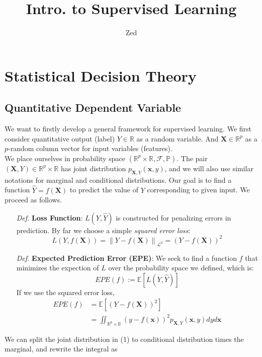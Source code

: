 \documentclass[a4paper, 11pt]{article}
\title{\textbf{Intro. to Supervised Learning}}
\author{Zed}
\begin{document}
\maketitle
\section{Statistical Decision Theory}

\subsection{Quantitative Dependent Variable}
We want to firstly develop a general framework for supervised learning. We first consider quantitative output (label) $Y\in \mathbb{R}$ as a random variable. And $\bm{X}\in \mathbb{R}^p$ as a $p$-random column vector for input variables (features). 
~\\
We place ourselves in probability space $(\mathbb{R}^p\times \mathbb{R}, \mathcal{F}, \mathbb{P})$. The pair $(\bm{X}, Y)\in \mathbb{R}^p\times \mathbb{R}$ has joint distribution $p_{\bm{X},Y}(\bm{x},y)$, and we will also use similar notations for marginal and conditional distributions. Our goal is to find a function $\hat{Y}=f(\bm{X})$ to predict the value of $Y$ corresponding to given input. We proceed as follows.
\begin{itemize}
	\item[\textit{Def.}] \textbf{Loss Function}: $L(Y, \hat{Y})$ is constructed for penalizing errors in prediction. By far we choose a simple \emph{squared error loss}:
	$$
	L(Y,f(\bm{X})) = \left\|Y-f(\bm{X})\right\|_{\mathcal{L}^2} = (Y-f(\bm{X}))^2
	$$

	\item[\textit{Def.}] \textbf{Expected Prediction Error (EPE)}: We seek to find a function $f$ that minimizes the expection of $L$ over the probability space we defined, which is:
	$$
	EPE(f):=\mathbb{E}\left[L(Y, \hat{Y})\right]
	$$
	If we use the squared error loss,
	\begin{equation}
		\begin{split}
			EPE(f) & = \mathbb{E}\left[(Y-f(\bm{X}))^2\right] \\
			& = \iint_{\mathbb{R}^p\times \mathbb{R}} (y-f(\bm{x}))^2 p_{\bm{X},Y}(\bm{x},y) dyd \bm{x}
		\end{split}
	\end{equation}
\end{itemize}
We can split the joint distribution in (1) to conditional distribution times the marginal, and rewrite the integral as 
\end{document}
